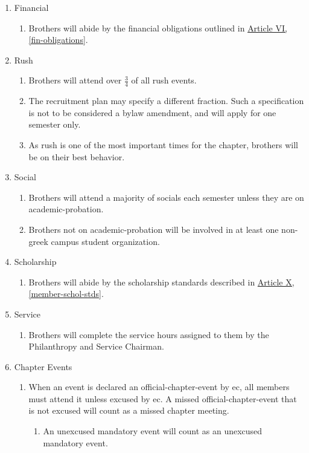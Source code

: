 	\begin{enumerate}
		\item Financial
			\begin{enumerate}
				\item Brothers will abide by the financial obligations outlined in \hyperref[fin-obligations]{Article VI, \autoref*{fin-obligations}}. 
			\end{enumerate}

		\item Rush
			\begin{enumerate}
				\label{rush-attend-std}
				\item Brothers will \gls{attend} over $\frac{3}{4}$ of all rush events.
                \item The recruitment plan may specify a different fraction.  Such a specification is not to be considered a bylaw amendment, and will apply for one semester only.
				\item As rush is one of the most important times for the chapter, brothers will be on their best behavior.
			\end{enumerate}

		\item Social
			\begin{enumerate}
				\item Brothers will \gls{attend} a majority of \glspl{social} each semester unless they are on \gls{academic-probation}. 
				\item Brothers not on \gls{academic-probation} will be involved in at least one non-greek campus student organization.
			\end{enumerate}

	\item Scholarship
		\begin{enumerate}
			\item Brothers will abide by the scholarship standards described in \hyperref[member-schol-stds]{Article X, \autoref*{member-schol-stds}}. 
		\end{enumerate}
	
	\item Service
		\begin{enumerate}
			\item Brothers will complete the service hours assigned to them by the Philanthropy and Service Chairman.
		\end{enumerate}

	\item Chapter Events
		\begin{enumerate}
			\item When an event is declared an \gls{official-chapter-event} by \gls{ec}, all members must \gls{attend} it unless excused by \gls{ec}. A missed \gls{official-chapter-event} that is not excused will count as a missed chapter meeting.
				\begin{enumerate}
					\item An unexcused mandatory event will count as an unexcused mandatory event.


\end{enumerate}
\end{enumerate}
\end{enumerate}
